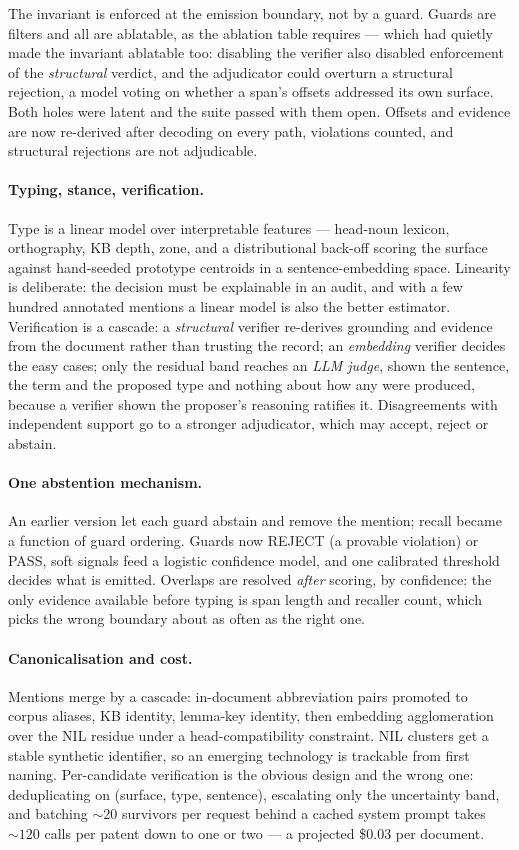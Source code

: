 \documentclass[11pt]{article}
\begin{document}
The invariant is enforced at the emission boundary, not by a guard. Guards are
filters and all are ablatable, as the ablation table requires --- which had
quietly made the invariant ablatable too: disabling the verifier also disabled
enforcement of the \emph{structural} verdict, and the adjudicator could overturn
a structural rejection, a model voting on whether a span's offsets addressed its
own surface. Both holes were latent and the suite passed with them open. Offsets
and evidence are now re-derived after decoding on every path, violations counted,
and structural rejections are not adjudicable.

\paragraph{Typing, stance, verification.} Type is a linear model over
interpretable features --- head-noun lexicon, orthography, KB depth, zone, and a
distributional back-off scoring the surface against hand-seeded prototype
centroids in a sentence-embedding space. Linearity is deliberate: the decision must be
explainable in an audit, and with a few hundred annotated mentions a linear model
is also the better estimator. Verification is a cascade: a \emph{structural}
verifier re-derives grounding and evidence from the document rather than trusting
the record; an \emph{embedding} verifier decides the easy cases; only the
residual band reaches an \emph{LLM judge}, shown the sentence, the term and the
proposed type and nothing about how any were produced, because a verifier shown
the proposer's reasoning ratifies it. Disagreements with independent support go
to a stronger adjudicator, which may accept, reject or abstain.

\paragraph{One abstention mechanism.} An earlier version let each guard abstain
and remove the mention; recall became a function of guard ordering. Guards now
REJECT (a provable violation) or PASS, soft signals feed a logistic confidence
model, and one calibrated threshold decides what is emitted. Overlaps are
resolved \emph{after} scoring, by confidence: the only evidence available before
typing is span length and recaller count, which picks the wrong boundary about as
often as the right one.

\paragraph{Canonicalisation and cost.} Mentions merge by a cascade: in-document
abbreviation pairs promoted to corpus aliases, KB identity, lemma-key identity,
then embedding agglomeration over the NIL residue under a head-compatibility
constraint. NIL clusters get a stable synthetic identifier, so an emerging
technology is trackable from first naming. Per-candidate verification is the
obvious design and the wrong one: deduplicating on (surface, type, sentence),
escalating only the uncertainty band, and batching ${\sim}20$ survivors per
request behind a cached system prompt takes ${\sim}120$ calls per patent down to
one or two --- a projected \$0.03 per document.
\end{document}
